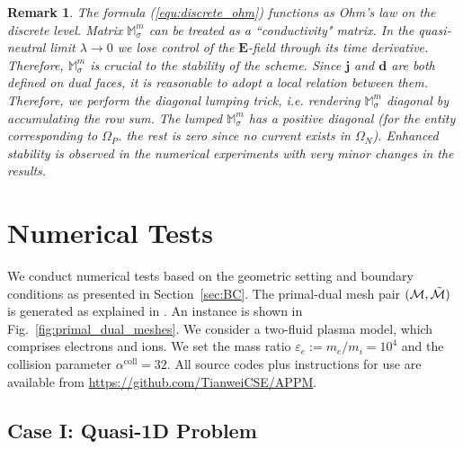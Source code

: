 \documentclass{article}
\newtheorem*{remark}{Remark}
\begin{document}
\begin{remark}
  The formula (\ref{equ:discrete_ohm}) functions as Ohm's law on the discrete
  level. Matrix $\mathbb{M}_\sigma^m$ can be treated as a ``conductivity" matrix. In the
  quasi-neutral limit $\lambda \rightarrow 0$ we lose control of the $\mathbf{E}$-field
  through its time derivative. Therefore, $\mathbb{M}_\sigma^m$ is crucial to the
  stability of the scheme. Since $\mathbf{j}$ and $\mathbf{d}$ are both defined on dual
  faces, it is reasonable to adopt a local relation between them. Therefore, we perform
  the \emph{diagonal lumping} trick, i.e. rendering $\mathbb{M}_\sigma^m$ diagonal by
  accumulating the row sum. The lumped $\mathbb{M}_\sigma^m$ has a positive diagonal (for
  the entity corresponding to $\Omega_P$. the rest is zero since no current exists in
  $\Omega_N$). Enhanced stability is observed in the numerical experiments with very minor
  changes in the results.
\end{remark}

\section{Numerical Tests} \label{sec:numerical_experiment}

We conduct numerical tests based on the geometric setting and boundary conditions as
presented in Section~\ref{sec:BC}. The primal-dual mesh pair
$(\mathcal{M}, \Tilde{\mathcal{M}})$ is generated as explained in
\cite[][Chapt.~1]{fuchs_2021}. An instance is shown in Fig.~\ref{fig:primal_dual_meshes}. We
consider a two-fluid plasma model, which comprises electrons and ions. We set the mass
ratio $\varepsilon_e := m_e / m_i = 10^4$ and the collision parameter
$\alpha^\text{coll} = 32$. All source codes plus instructions for use are available from
\url{https://github.com/TianweiCSE/APPM}.

\subsection{Case I: Quasi-1D Problem}
\end{document}
